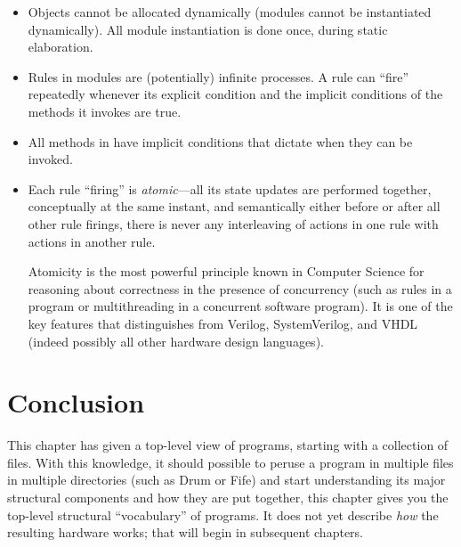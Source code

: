 \begin{itemize}

 \item Objects cannot be allocated dynamically (modules cannot be
       instantiated dynamically).  All module instantiation is done
       once, during static elaboration.

 \item Rules in {\BSV} modules are (potentially) infinite processes.  A
       rule can ``fire'' repeatedly whenever its explicit condition
       and the implicit conditions of the methods it invokes are true.

 \item All methods in {\BSV} have implicit conditions that dictate when
       they can be invoked.

 \item Each rule ``firing'' is \emph{atomic}---all its state updates
       are performed together, conceptually at the same instant, and
       semantically either before or after all other rule firings,
       {\ie} there is never any interleaving of actions in one rule
       with actions in another rule.

       Atomicity is the most powerful principle known in Computer
       Science for reasoning about correctness in the presence of
       concurrency (such as rules in a {\BSV} program or multithreading
       in a concurrent software program).  It is one of the key
       features that distinguishes {\BSV} from Verilog, SystemVerilog,
       and VHDL (indeed possibly all other hardware design languages).

\end{itemize}


\section{Conclusion}

This chapter has given a top-level view of {\BSV} programs, starting with
a collection of files.  With this knowledge, it should possible to
peruse a {\BSV} program in multiple files in multiple directories (such
as Drum or Fife) and start understanding its major structural
components and how they are put together, {\ie} this chapter gives you
the top-level structural ``vocabulary'' of {\BSV} programs.  It does not
yet describe \emph{how} the resulting hardware works; that will begin
in subsequent chapters.

